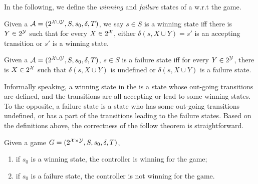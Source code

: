  In the following, we define the \emph{winning} and \emph{failure} states of a \tdfa w.r.t the \tdfa game.

\begin{definition}\label{def:winning_state}
\label{def:win_st}
Given a \tdfa $\mathcal{A} =(2^{\mathcal{X}\cup \mathcal{Y}},S,s_0,\delta,T)$, we say $s\in S$ is a winning state iff there is $Y \in 2^{\mathcal{Y}}$ such that for every $X \in 2^{\mathcal{X}}$, either $\delta(s,X\cup Y)=s'$ is an accepting transition or $s'$ is a winning state. 
\end{definition}

\begin{definition}\label{def:failure_state}
Given a \tdfa $\mathcal{A} =(2^{\mathcal{X}\cup \mathcal{Y}},S,s_0,\delta,T)$, $s\in S$ is a failure state iff for every $Y \in 2^{\mathcal{Y}}$, there is $X \in 2^{\mathcal{X}}$ such that $\delta(s,X \cup Y)$ is undefined or $\delta(s,X \cup Y)$ is a failure state. 
\end{definition}
Informally speaking, a winning state in the \tdfa is a state whose out-going transitions are defined, and the transitions are all accepting or lead to some winning states. To the opposite, a failure state is a state who has some out-going transitions undefined, or has a part of the transitions leading to the failure states. Based on the definitions above, the correctness of the follow theorem is straightforward. 

\begin{theorem}\label{thm:winning-and-failure}
Given a \tdfa game $G =(2^{\mathcal{X}\times \mathcal{Y}},S,s_0,\delta,T)$, 
\begin{enumerate}
	\item if $s_0$ is a winning state, the controller is winning for the game; 
	\item if $s_0$ is a failure state, the controller is not winning for the game.
\end{enumerate}
\end{theorem}


